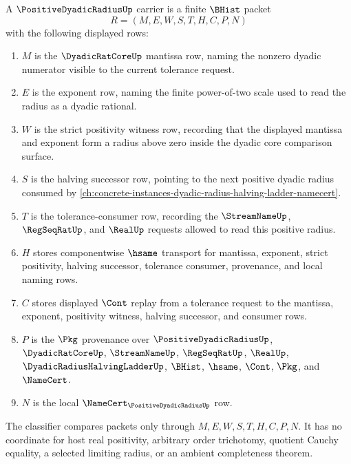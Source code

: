 \begin{definition}
\label{def:positive-dyadic-radius-carrier}
A $\PositiveDyadicRadiusUp$ carrier is a finite $\BHist$ packet
$$
R=(M,E,W,S,T,H,C,P,N)
$$
with the following displayed rows:
\begin{enumerate}
\item $M$ is the $\DyadicRatCoreUp$ mantissa row, naming the nonzero dyadic numerator visible to the current tolerance request.
\item $E$ is the exponent row, naming the finite power-of-two scale used to read the radius as a dyadic rational.
\item $W$ is the strict positivity witness row, recording that the displayed mantissa and exponent form a radius above zero inside the dyadic core comparison surface.
\item $S$ is the halving successor row, pointing to the next positive dyadic radius consumed by \autoref{ch:concrete-instances-dyadic-radius-halving-ladder-namecert}.
\item $T$ is the tolerance-consumer row, recording the $\StreamNameUp$, $\RegSeqRatUp$, and $\RealUp$ requests allowed to read this positive radius.
\item $H$ stores componentwise $\hsame$ transport for mantissa, exponent, strict positivity, halving successor, tolerance consumer, provenance, and local naming rows.
\item $C$ stores displayed $\Cont$ replay from a tolerance request to the mantissa, exponent, positivity witness, halving successor, and consumer rows.
\item $P$ is the $\Pkg$ provenance over $\PositiveDyadicRadiusUp$, $\DyadicRatCoreUp$, $\StreamNameUp$, $\RegSeqRatUp$, $\RealUp$, $\DyadicRadiusHalvingLadderUp$, $\BHist$, $\hsame$, $\Cont$, $\Pkg$, and $\NameCert$.
\item $N$ is the local $\NameCert_{\PositiveDyadicRadiusUp}$ row.
\end{enumerate}
The classifier compares packets only through $M,E,W,S,T,H,C,P,N$. It has no coordinate for host real positivity, arbitrary order trichotomy, quotient Cauchy equality, a selected limiting radius, or an ambient completeness theorem.
\end{definition}

